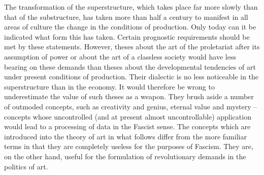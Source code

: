 \documentclass{article}
\begin{document}
The transformation of the superstructure, which takes place far more slowly
than that of the substructure, has taken more than half a century to manifest
in all areas of culture the change in the conditions of production. Only today
can it be indicated what form this has taken. Certain prognostic requirements
should be met by these statements. However, theses about the art of the
proletariat after its assumption of power or about the art of a classless
society would have less bearing on these demands than theses about the
developmental tendencies of art under present conditions of production. Their
dialectic is no less noticeable in the superstructure than in the economy. It
would therefore be wrong to underestimate the value of such theses as a weapon.
They brush aside a number of outmoded concepts, such as creativity and genius,
eternal value and mystery – concepts whose uncontrolled (and at present almost
uncontrollable) application would lead to a processing of data in the Fascist
sense. The concepts which are introduced into the theory of art in what follows
differ from the more familiar terms in that they are completely useless for the
purposes of Fascism. They are, on the other hand, useful for the formulation of
revolutionary demands in the politics of art.

\section{}
\end{document}
